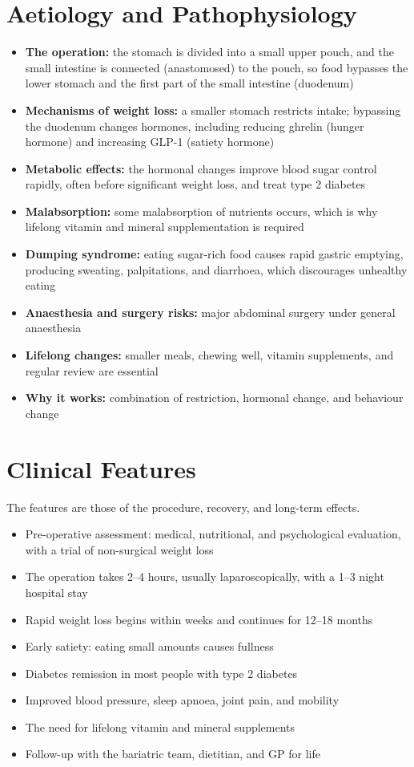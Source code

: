 \section*{Aetiology and Pathophysiology}
\begin{itemize}
    \item \textbf{The operation:} the stomach is divided into a small upper pouch, and the small intestine is connected (anastomosed) to the pouch, so food bypasses the lower stomach and the first part of the small intestine (duodenum)
    \item \textbf{Mechanisms of weight loss:} a smaller stomach restricts intake; bypassing the duodenum changes hormones, including reducing ghrelin (hunger hormone) and increasing GLP-1 (satiety hormone)
    \item \textbf{Metabolic effects:} the hormonal changes improve blood sugar control rapidly, often before significant weight loss, and treat type 2 diabetes
    \item \textbf{Malabsorption:} some malabsorption of nutrients occurs, which is why lifelong vitamin and mineral supplementation is required
    \item \textbf{Dumping syndrome:} eating sugar-rich food causes rapid gastric emptying, producing sweating, palpitations, and diarrhoea, which discourages unhealthy eating
    \item \textbf{Anaesthesia and surgery risks:} major abdominal surgery under general anaesthesia
    \item \textbf{Lifelong changes:} smaller meals, chewing well, vitamin supplements, and regular review are essential
    \item \textbf{Why it works:} combination of restriction, hormonal change, and behaviour change
\end{itemize}

\section*{Clinical Features}
The features are those of the procedure, recovery, and long-term effects.
\begin{itemize}
    \item Pre-operative assessment: medical, nutritional, and psychological evaluation, with a trial of non-surgical weight loss
    \item The operation takes 2--4 hours, usually laparoscopically, with a 1--3 night hospital stay
    \item Rapid weight loss begins within weeks and continues for 12--18 months
    \item Early satiety: eating small amounts causes fullness
    \item Diabetes remission in most people with type 2 diabetes
    \item Improved blood pressure, sleep apnoea, joint pain, and mobility
    \item The need for lifelong vitamin and mineral supplements
    \item Follow-up with the bariatric team, dietitian, and GP for life
\end{itemize}

